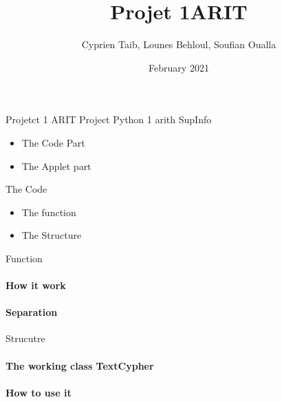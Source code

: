\documentclass{beamer}
\title{Projet 1ARIT}
\author{Cyprien Taib, Lounes Behloul, Soufian Oualla}
\date{February 2021}
\begin{document}
    \begin{frame}{Projetct 1 ARIT}
        \Large Project Python 1 arith SupInfo
        \begin{center}
            \small{
                \begin{itemize}
                    \item The Code Part 
                    \item The Applet part 
                \end{itemize}
            }
        \end{center}
	\end{frame}
    
    \begin{frame}{The Code }
        \begin{center}
            \small{
                \begin{itemize}
                    \item The function 
                    \item The Structure
                \end{itemize}
            }
        \end{center}

    \end{frame}

    \begin{frame}{Function}
        \paragraph{How it work}        
        \paragraph{Separation}
        
    \end{frame}

    \begin{frame}{Strucutre}
        \paragraph{The working class TextCypher}
        \paragraph{How to use it}
    \end{frame}
\end{document}
